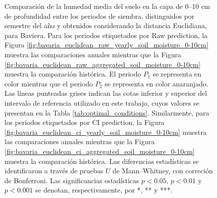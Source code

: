 \begin{figure}[htbp]
	\caption{
		Comparación de la humedad media del suelo en la capa de 0--10 cm de profundidad entre los periodos de siembra, distinguidos por semestre del año y obtenidos considerando la distancia Euclidiana, para Baviera. Para los periodos etiquetados por Raw prediction, la Figura \ref{fig:bavaria_euclidean_raw_yearly_soil_moisture_0-10cm} muestra las comparaciones anuales mientras que la Figura \ref{fig:bavaria_euclidean_raw_aggregated_soil_moisture_0-10cm} muestra la comparación histórica. El periodo $P_1$ se representa en color mientras que el periodo $P_2$ se representa en color anaranjado. Las líneas punteadas grises indican las cotas inferior y superior del intervalo de referencia utilizado en este trabajo, cuyos valores se presentan en la Tabla \ref{tab:optimal_conditions}. Similarmente, para los periodos etiquetados por CI prediction, la Figura \ref{fig:bavaria_euclidean_ci_yearly_soil_moisture_0-10cm} muestra las comparaciones anuales mientras que la Figura \ref{fig:bavaria_euclidean_ci_aggregated_soil_moisture_0-10cm} muestra la comparación histórica. Las diferencias estadísticas se identificaron a través de pruebas $U$ de Mann--Whitney, con correción de Bonferroni. Las significancias estadísticas $p<0.05$, $p<0.01$ y $p<0.001$ se denotan, respectivamente, por *, ** y ***.
	}
	\label{fig:bavaria_euclidean_soil_moisture_0-10cm}
	
	
\end{figure}



